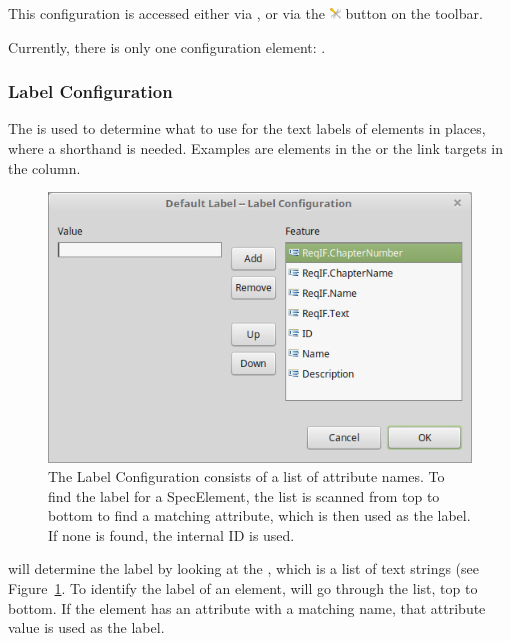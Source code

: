 This configuration is accessed either via , or
via the \includegraphics[height=0.8em]{../rmf-images/ReqIFUIToolExtension.png} button on the toolbar.

Currently, there is only one configuration element: .

\subsubsection{Label Configuration}

The  is used to determine what to use for the text labels of elements
in places, where a shorthand is needed.  Examples are elements in the  or the link targets in the  column.

\begin{figure}
\centering     
\includegraphics[width=0.8\linewidth]{../rmf-images/label-configuration.png}
\caption{The Label Configuration consists of a list of attribute names. To find the label for a SpecElement, the list is scanned from top to bottom to find a matching attribute, which is then used as the label. If none is found, the internal ID is used.}
\label{fig:label-configuration}
\end{figure}

\pror{} will determine the label by looking at the , which is a list of text strings (see Figure~\ref{fig:label-configuration}.
To identify the label of an element, \pror{} will go through the list, top to bottom.  If the element has an attribute with a matching name, that attribute value is used as the label.

